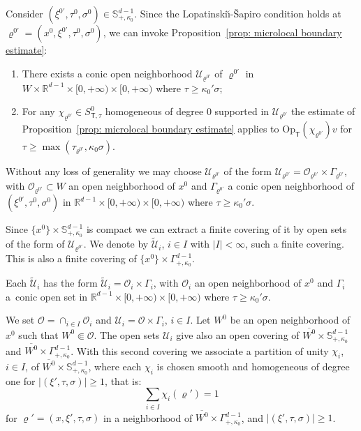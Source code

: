 \documentclass[10pt]{amsart}
\theoremstyle{plain}
\theoremstyle{definition}
\def\R{\mathbb{R}}
\newcommand{\LS}{Lopatinski\u{\i}-\v{S}apiro\xspace}
\newcommand{\nhd}{neighborhood\xspace}
\let\k\kappa
\let\y\varrho
\newcommand{\ovl}[1]{\overline{#1}}
\newcommand{\scrO}{\mathscr O}
\newcommand{\U}{\mathscr U}
\newcommand{\Opt}{\ensuremath{\mathrm{Op}_{\scriptscriptstyle{\mathsf{T}}}}}
\newcommand{\Ssct}{S_{{\scriptscriptstyle{\mathsf T}},\tau}}
\begin{document}
Consider $(\xi^{0\prime},\tau^0,\sigma^0) \in \mathbb{S}^{d-1}_{+, \k_0}$.
Since the \LS condition holds at
$\y^{0\prime} = (x^0, \xi^{0\prime},\tau^0,\sigma^0)$, we can invoke
Proposition~\ref{prop: microlocal boundary estimate}:
\begin{enumerate}
\item There exists a conic open neighborhood
$\U_{\y^{0\prime}}$ of $\y^{0\prime}$ in
$W \times \R^{d-1}\times [0,+\infty) \times [0,+\infty)$ where
$\tau \geq \k_0' \sigma$;
\item For any $\chi_{\y^{0\prime}} \in \Ssct^0$ homogeneous of
degree $0$ supported in $\U_{\y^{0\prime}}$ the estimate of
Proposition~\ref{prop: microlocal boundary estimate} applies to $\Opt(\chi_{\y^{0\prime}}) v$ for $\tau
\geq \max (\tau_{\y^{0\prime}} , \k_0\sigma)$.
\end{enumerate}
Without any loss of generality we may choose $\U_{\y^{0\prime}}$ of
the form $\U_{\y^{0\prime}} = \scrO_{\y^{0\prime}} \times
\Gamma_{\y^{0\prime}}$, with $\scrO_{\y^{0\prime}} \subset W$ an open \nhd of
$x^0$ and $\Gamma_{\y^{0\prime}}$ a conic open \nhd of
$(\xi^{0\prime},\tau^0,\sigma^0)$ in $\R^{d-1}\times [0,+\infty) \times
[0,+\infty)$ where $\tau \geq \k_0' \sigma$.

Since $\{ x^0\} \times \mathbb{S}^{d-1}_{+, \k_0}$ is compact we can
extract a finite covering of it by open sets of the form of
$\U_{\y^{0\prime}}$. We denote by
$\tilde{\U}_i$, $i \in I$ with $|I| < \infty$, such a finite covering. This is
also a finite covering of
$\{x^0\} \times \Gamma^{d-1}_{+, \k_0}$.

Each $\tilde{\U}_i$ has the form $\tilde{\U}_i = \scrO_i \times
\Gamma_i$, with $\scrO_i$ an open \nhd of
$x^0$ and $\Gamma_i$ a~conic open set in $\R^{d-1}\times [0,+\infty) \times
[0,+\infty)$ where $\tau \geq \k_0' \sigma$.

We set $\scrO = \cap_{i \in I} \scrO_i$ and
$\U_i = \scrO \times \Gamma_i$, $i \in I$.
Let $W^0$ be an open \nhd of~$x^0$ such that $W^0 \Subset
\scrO$. The open sets $\U_i$
give also an open covering of $\ovl{W^0} \times \mathbb{S}^{d-1}_{+,
\k_0}$ and $\ovl{W^0} \times \Gamma^{d-1}_{+, \k_0}$.
With this second covering we associate a partition of unity
$\chi_i$, $i \in I$, of $\ovl{W^0} \times \mathbb{S}^{d-1}_{+,
\k_0}$,
where each $\chi_i$ is chosen smooth and homogeneous
of degree one for $|(\xi', \tau, \sigma)| \geq 1$, that is:\enlargethispage{-\baselineskip}
\begin{equation*}
\sum_{i \in I}\chi_i(\y')=1
\end{equation*}
for $\y' = (x, \xi', \tau, \sigma)$ in a \nhd
of $\ovl{W^0} \times \Gamma^{d-1}_{+, \k_0}$,
and $|(\xi', \tau, \sigma)| \geq 1$.
\end{document}
